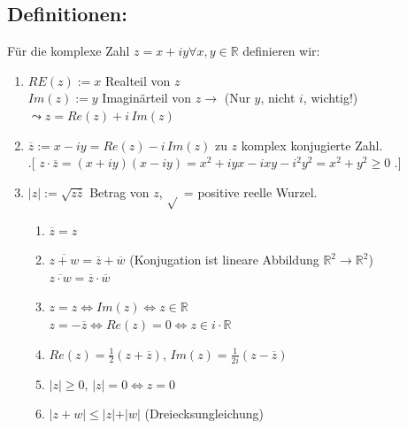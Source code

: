 \subsection{Definitionen:}
Für die komplexe Zahl $z=x+iy \forall x,y \in \mathbb{R}$ definieren wir:
\begin{enumerate}
\item $RE(z):=x$ Realteil von $z$\\
	$Im(z):=y$ Imaginärteil von $z \rightarrow$ (Nur $y$, nicht $i$, wichtig!)\\
	$\leadsto z=Re(z)+i\,Im(z)$
\item $\overline{z}:=x-iy=Re(z)-i\,Im(z)$ zu $z$ komplex konjugierte Zahl. \\
	.[ $z\cdot\overline{z} = (x+iy)(x-iy) = x^{2}+iyx-ixy-i^{2}y^{2} = x^{2}+y^{2}\geq0$ .]
\item $\vert z\vert :=\sqrt{z\overline{z}}$ Betrag von $z$, $\sqrt{}$ = positive reelle Wurzel.\\
	\begin{enumerate}
	\item $\overline{z}=z$
	\item $\overline{z+w}=\overline{z}+\overline{w}$  (Konjugation ist lineare Abbildung 
	$\mathbb{R}^{2}\rightarrow\mathbb{R}^{2}$)\\
	$\overline{z\cdot w} = \overline{z}\cdot\overline{w}$
	\item $z=z\Leftrightarrow Im(z)\Leftrightarrow z\in \mathbb{R}$\\
	$z=-\overline{z}\Leftrightarrow Re(z)=0\Leftrightarrow z \in i\cdot\mathbb{R}$
	\item $Re(z)=\frac{1}{2}(z+\overline{z}), \,Im(z)=\frac{1}{2i}(z-\overline{z})$
	\item$\vert z\vert \geq 0, \,  \vert z \vert = 0 \Leftrightarrow z = 0$
	\item $\vert z+w \vert \leq \vert z \vert + \vert w \vert$ (Dreiecksungleichung)
	\end{enumerate}
\end{enumerate}
%
%
%
